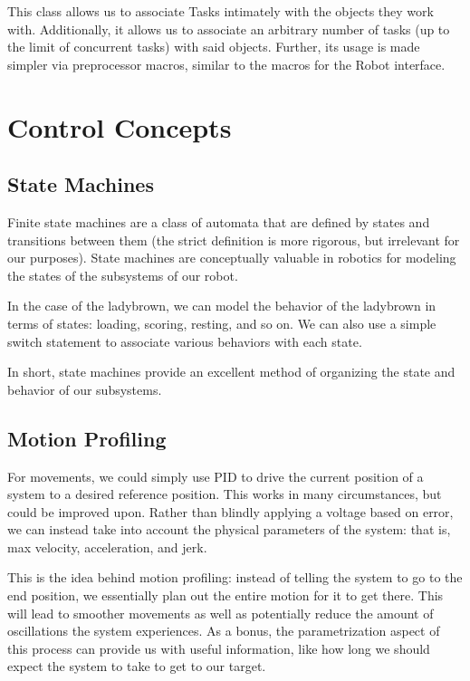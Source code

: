 This class allows us to associate Tasks intimately with the objects they work with. Additionally, it allows us to associate an arbitrary number of tasks (up to the limit of concurrent tasks) with said objects. Further, its usage is made simpler via preprocessor macros, similar to the macros for the Robot interface. 

\section{Control Concepts}
\subsection{State Machines}
Finite state machines are a class of automata that are defined by states and transitions between them (the strict definition is more rigorous, but irrelevant for our purposes). State machines are conceptually valuable in robotics for modeling the states of the subsystems of our robot.

In the case of the ladybrown, we can model the behavior of the ladybrown in terms of states: loading, scoring, resting, and so on. We can also use a simple switch statement to associate various behaviors with each state. 

In short, state machines provide an excellent method of organizing the state and behavior of our subsystems. 



\subsection{Motion Profiling}
For movements, we could simply use PID to drive the current position of a system to a desired reference position. This works in many circumstances, but could be improved upon. Rather than blindly applying a voltage based on error, we can instead take into account the physical parameters of the system: that is, max velocity, acceleration, and jerk. 

This is the idea behind motion profiling: instead of telling the system to go to the end position, we essentially plan out the entire motion for it to get there. This will lead to smoother movements as well as potentially reduce the amount of oscillations the system experiences. As a bonus, the parametrization aspect of this process can provide us with useful information, like how long we should expect the system to take to get to our target. 

